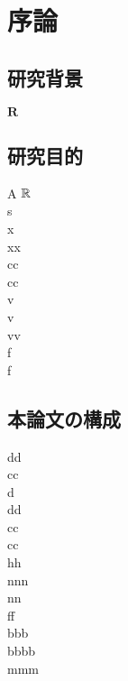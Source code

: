 \chapter{序論}
\section{研究背景}
$\bm{R}$
\section{研究目的}
A $\mathbb{R}$ \\
s \\
x\\
xx\\
cc \\
cc\\
v\\
v\\
vv\\
f\\
f\\
\section{本論文の構成}
dd\\
cc \\
d\\
dd\\
cc\\
cc\\
hh\\
nnn\\
nn\\
ff\\
bbb\\
bbbb\\
mmm\\